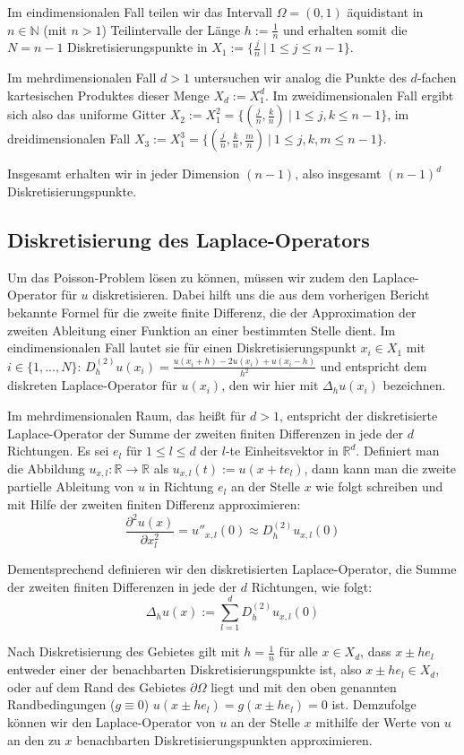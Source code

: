 \documentclass{scrartcl}
\newcommand{\R}{\mathbb{R}}
\begin{document}
Im eindimensionalen Fall teilen wir das Intervall $\Omega=(0,1)$ äquidistant in
$n\in\mathbb{N}$ (mit $n>1$) Teilintervalle der Länge $h:=\frac{1}{n}$ und erhalten somit die $N=n-1$ Diskretisierungspunkte in
$X_1:=\{\frac{j}{n} \: | \: 1\leq j \leq n-1\}$.

Im mehrdimensionalen Fall $d>1$ untersuchen wir analog die Punkte des $d$-fachen kartesischen Produktes dieser Menge $X_d := X_1^d$.
Im zweidimensionalen Fall ergibt sich also das uniforme Gitter $X_2 := X_1^2 = \{(\frac{j}{n}, \frac{k}{n}) \: | \: 1\leq j,k \leq n-1\}$,
im dreidimensionalen Fall $X_3 := X_1^3 = \{(\frac{j}{n}, \frac{k}{n}, \frac{m}{n}) \: | \: 1\leq j,k,m \leq n-1\}$.

Insgesamt erhalten wir in jeder Dimension $(n-1)$, also insgesamt $(n-1)^d$ Diskretisierungspunkte.\cite{rabus2019}

\subsection{Diskretisierung des Laplace-Operators}
Um das Poisson-Problem lösen zu können, müssen wir zudem den Laplace-Operator für $u$ diskretisieren.
Dabei hilft uns die aus dem vorherigen Bericht bekannte Formel für die zweite finite Differenz, die der Approximation der zweiten Ableitung einer Funktion an einer bestimmten Stelle dient.
Im eindimensionalen Fall lautet sie für einen Diskretisierungspunkt $x_i\in X_1$ mit $i \in \{1,...,N\}$:
$D_h^{(2)}u(x_i) = \frac{u(x_i+h) - 2u(x_i)+u(x_i-h)}{h^2}$ und entspricht dem diskreten Laplace-Operator für $u(x_i)$, den wir hier mit $\Delta_h u(x_i)$ bezeichnen.

Im mehrdimensionalen Raum, das heißt für $d>1$, entspricht der diskretisierte Laplace-Operator der Summe der zweiten finiten Differenzen in jede der $d$ Richtungen.
Es sei $e_l$ für $1\leq l \leq d$ der $l$-te Einheitsvektor in $\R^d$. Definiert man die Abbildung $u_{x,l}:\R\to\R$ als $u_{x,l}(t):=u(x+te_l)$, dann kann man die zweite partielle Ableitung von $u$ in Richtung $e_l$ an der Stelle $x$ wie folgt schreiben und mit Hilfe der zweiten finiten Differenz approximieren:
\[\frac{\partial^2 u(x)}{\partial x_l^2} = u''_{x,l}(0) \approx D_h^{(2)}u_{x,l}(0)\]

Dementsprechend definieren wir den diskretisierten Laplace-Operator, die Summe der zweiten finiten Differenzen in jede der $d$ Richtungen, wie folgt:
\[\Delta_h u(x):= \sum_{l=1}^{d} D_h^{(2)}u_{x,l}(0)\]

Nach Diskretisierung des Gebietes gilt mit $h=\frac{1}{n}$ für alle $x\in X_d$, dass $x\pm he_l$ entweder einer der benachbarten Diskretisierungspunkte ist, also $x\pm he_l\in X_d$, oder auf dem Rand des Gebietes $\partial\Omega$ liegt und mit den oben genannten Randbedingungen ($g\equiv0$) $u(x\pm he_l)=g(x\pm he_l)=0$ ist.
Demzufolge können wir den Laplace-Operator von $u$ an der Stelle $x$ mithilfe der Werte von $u$ an den zu $x$ benachbarten Diskretisierungspunkten approximieren.
\end{document}
